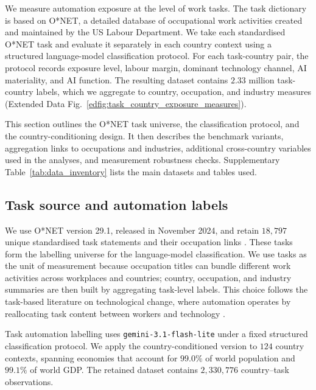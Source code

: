 \documentclass[11pt]{article}
\begin{document}
We measure automation exposure at the level of work tasks. The task dictionary is based on O*NET, a detailed database of occupational work activities created and maintained by the US Labour Department. We take each standardised O*NET task and evaluate it separately in each country context using a structured language-model classification protocol. For each task-country pair, the protocol records exposure level, labour margin, dominant technology channel, AI materiality, and AI function. The resulting dataset contains $2.33$ million task-country labels, which we aggregate to country, occupation, and industry measures (Extended Data Fig.~\ref{edfig:task_country_exposure_measures}).

This section outlines the O*NET task universe, the classification protocol, and the country-conditioning design. It then describes the benchmark variants, aggregation links to occupations and industries, additional cross-country variables used in the analyses, and measurement robustness checks. Supplementary Table~\ref{tab:data_inventory} lists the main datasets and tables used.

\FloatBarrier
\subsection{Task source and automation labels}
\label{sec:methods_exposure}

We use O*NET version 29.1, released in November 2024, and retain $18{,}797$ unique standardised task statements and their occupation links \citep{onet2024,onet_database_29_1}. These tasks form the labelling universe for the language-model classification. We use tasks as the unit of measurement because occupation titles can bundle different work activities across workplaces and countries; country, occupation, and industry summaries are then built by aggregating task-level labels. This choice follows the task-based literature on technological change, where automation operates by reallocating task content between workers and technology \citep{AutorLevyMurnane2003,AcemogluAutor2011,AcemogluRestrepo2018}.

Task automation labelling uses \texttt{gemini-3.1-flash-lite} under a fixed structured classification protocol. We apply the country-conditioned version to $124$ country contexts, spanning economies that account for $99.0\%$ of world population and $99.1\%$ of world GDP. The retained dataset contains $2{,}330{,}776$ country--task observations.
\end{document}
